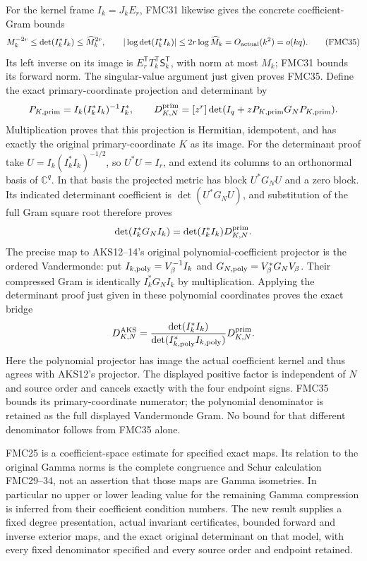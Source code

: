 \documentclass[11pt,a4paper]{article}
\begin{document}
For the kernel frame $I_k=J_kE_r$, FMC31 likewise gives the concrete
coefficient-Gram bounds
\[
 M_k^{-2r}\le\det(I_k^*I_k)\le\widehat M_k^{2r},\qquad
 |\log\det(I_k^*I_k)|
             \le2r\log\widehat M_k=O_{\rm actual}(k^2)=o(kq).
 \tag{FMC35}
\]
Its left inverse on its image is
$E_r^{\mathsf T}T_k^{\mathsf T}\mathsf S_k^{\mathsf T}$, with norm
at most $M_k$; FMC31 bounds its forward norm. The singular-value
argument just given proves FMC35. Define the exact primary-coordinate
projection and determinant by
\[
 P_{K,\rm prim}=I_k(I_k^*I_k)^{-1}I_k^*,\qquad
 D_{K,N}^{\rm prim}=[z^r]\det(I_q+zP_{K,\rm prim}G_NP_{K,\rm prim}).
\]
Multiplication proves that this projection is Hermitian, idempotent,
and has exactly the original primary-coordinate $K$ as its image.
For the determinant proof take $U=I_k(I_k^*I_k)^{-1/2}$, so
$U^*U=I_r$, and extend its columns to an orthonormal basis of
$\mathbb C^q$. In that basis the projected metric has block
$U^*G_NU$ and a zero block. Its indicated determinant coefficient
is $\det(U^*G_NU)$, and substitution of the full Gram square root
therefore proves
\[
 \det(I_k^*G_NI_k)=\det(I_k^*I_k)D_{K,N}^{\rm prim}.
\]
The precise map to AKS12--14's original polynomial-coefficient
projector is the ordered Vandermonde: put
$I_{k,\rm poly}=V_\beta^{-1}I_k$ and
$G_{N,\rm poly}=V_\beta^*G_NV_\beta$.
Their compressed Gram is identically $I_k^*G_NI_k$ by
multiplication. Applying the determinant proof just given in
these polynomial coordinates proves the exact bridge
\[
 D_{K,N}^{\rm AKS}
    =\frac{\det(I_k^*I_k)}
            {\det(I_{k,\rm poly}^*I_{k,\rm poly})}
                         D_{K,N}^{\rm prim}.
\]
Here the polynomial projector has image the actual coefficient
kernel and thus agrees with AKS12's projector. The displayed
positive factor is independent of $N$ and source order and
cancels exactly with the four endpoint signs. FMC35 bounds its
primary-coordinate numerator; the polynomial denominator is
retained as the full displayed Vandermonde Gram. No bound for
that different denominator follows from FMC35 alone.

FMC25 is a coefficient-space estimate for specified exact maps.
Its relation to the original Gamma norms is the complete congruence
and Schur calculation FMC29--34, not an assertion that those maps
are Gamma isometries. In particular no upper or lower leading
value for the remaining Gamma compression is inferred from their
coefficient condition numbers. The new result supplies a fixed
degree presentation, actual invariant certificates, bounded forward
and inverse exterior maps, and the exact original determinant on
that model, with every fixed denominator specified and every
source order and endpoint retained.
\end{document}

